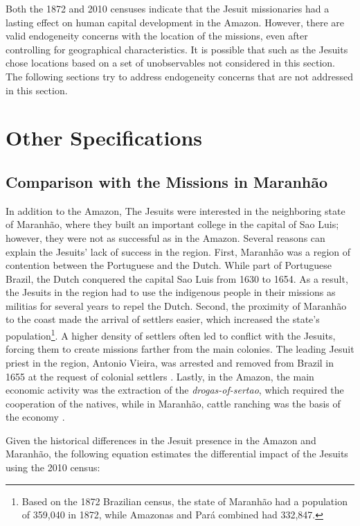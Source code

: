 \documentclass{article}
\begin{document}
Both the 1872 and 2010 censuses indicate that the Jesuit missionaries had a lasting effect on human capital development in the Amazon.
However, there are valid endogeneity concerns with the location of the missions, even after controlling for geographical characteristics. 
It is possible that such as the Jesuits chose locations based on a set of unobservables not considered in this section.
The following sections try to address endogeneity concerns that are not addressed in this section. 

\section{Other Specifications}

\subsection{Comparison with the Missions in Maranhão}

In addition to the Amazon, The Jesuits were interested in the neighboring state of Maranhão, where they built an important college in the capital of Sao Luis; however, they were not as successful as in the Amazon. 
Several reasons can explain the Jesuits' lack of success in the region. 
First, Maranhão was a region of contention between the Portuguese and the Dutch. 
While part of Portuguese Brazil, the Dutch conquered the capital Sao Luis from 1630 to 1654. 
As a result, the Jesuits in the region had to use the indigenous people in their missions as militias for several years to repel the Dutch. 
Second, the proximity of Maranhão to the coast made the arrival of settlers easier, which increased the state's population\footnote{
  Based on the 1872 Brazilian census, the state of Maranhão had a population of 359,040 in 1872, while Amazonas and Pará combined had 332,847.}. 
A higher density of settlers often led to conflict with the Jesuits, forcing them to create missions farther from the main colonies. 
The leading Jesuit priest in the region, Antonio Vieira, was arrested and removed from Brazil in 1655 at the request of colonial settlers \parencite{Leite1943-dy}.
Lastly, in the Amazon, the main economic activity was the extraction of the \textit{drogas-of-sertao}, which required the cooperation of the natives, while in Maranhão, cattle ranching was the basis of the economy \parencite{Chambouleyron2019-tm}. 

Given the historical differences in the Jesuit presence in the Amazon and Maranhão, the following equation estimates the differential impact of the Jesuits using the 2010 census:
\end{document}
